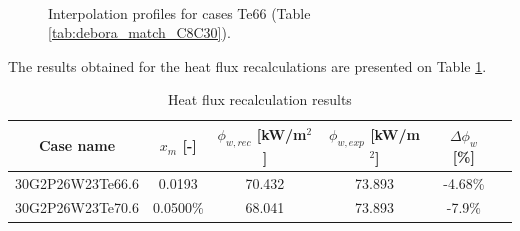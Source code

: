 \begin{figure}[h!]
\centering

\\

\caption{Interpolation profiles for cases Te66 (Table \ref{tab:debora_match_C8C30}).}
\label{fig:debora_interpol}
\end{figure}


The results obtained for the heat flux recalculations are presented on Table \ref{tab:debora_flux_corr_res}.

\begin{table}[!h]
\centering

\begin{tabular}{c||c|c|c|c|c}
Case name & $x_{m}$ [-] & $\phi_{w,rec}$ [kW/m$^{2}$] & $\phi_{w,exp}$ [kW/m$^{2}$] & $\Delta \phi_{w}$ [\%]  \\
\hline
\hline
30G2P26W23Te66.6 & 0.0193 & 70.432 & 73.893 & -4.68\%\\
\hline
30G2P26W23Te70.6 & 0.0500\% & 68.041 & 73.893 & -7.9\%\\
\end{tabular}

\caption{Heat flux recalculation results}
\label{tab:debora_flux_corr_res}

\end{table}

